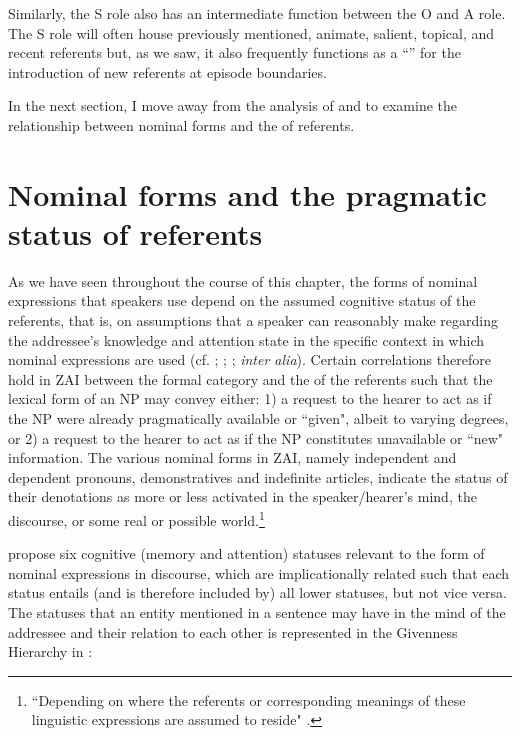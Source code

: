 Similarly, the S role also has an intermediate function between the O and A role. The S role will often house previously mentioned, animate, salient, topical, and recent referents but, as we saw, it also frequently functions as a ``'' for the introduction of new referents at episode boundaries.

In the next section, I move away from the analysis of  and  to examine the relationship between nominal forms and the  of referents.


\section{Nominal forms and the pragmatic status of referents}\label{nomforms}

As we have seen throughout the course of this chapter, the forms of nominal expressions that speakers use depend on the assumed cognitive status of the referents, that is, on assumptions that a speaker can reasonably make regarding the addressee's knowledge and attention state in the specific context in which nominal expressions are used (cf. \citealt{chafe1976}; \citealt{prince1981}; \citealt{ariel1988}; \textit{inter alia}). Certain correlations therefore hold in ZAI between the formal category and the  of the referents such that the lexical form of an NP may convey either: 1) a request to the hearer to act as if the NP were already pragmatically available or ``given", albeit  to varying degrees, or 2) a request to the hearer to act as if the NP constitutes unavailable or ``new" information. The various nominal forms in ZAI, namely independent and dependent pronouns, demonstratives and indefinite articles, indicate the status of their denotations as more or less activated in the speaker/hearer's mind, the discourse, or some real or possible world.\footnote{``Depending on where the referents or corresponding meanings of these linguistic expressions are assumed to reside" \citep[177]{gundel2001}.} 

\citet{gundel1993} propose six cognitive (memory and attention) statuses relevant to the form of nominal expressions in discourse, which are implicationally related such that each status entails (and is therefore included by) all lower statuses, but not vice versa. The statuses that an entity mentioned in a sentence may have in the mind of the addressee and their relation to each other is represented in the Givenness Hierarchy in :

